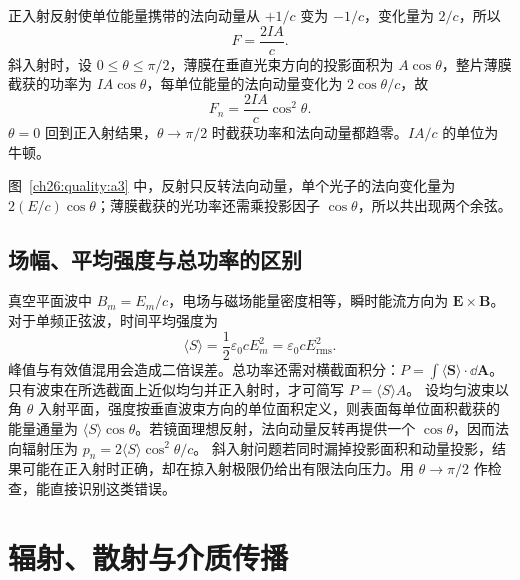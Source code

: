 {\begin{xesolution}
\begin{center}
\begin{minipage}{.96\linewidth}
\end{minipage}\end{center}

正入射反射使单位能量携带的法向动量从 $+1/c$ 变为 $-1/c$，变化量为 $2/c$，所以
\[
 \boxed{F=\frac{2IA}{c}}.
\]
斜入射时，设 $0\le\theta\le\pi/2$，薄膜在垂直光束方向的投影面积为 $A\cos\theta$，整片薄膜截获的功率为 $IA\cos\theta$，每单位能量的法向动量变化为
$2\cos\theta/c$，故
\[
 \boxed{F_n=\frac{2IA}{c}\cos^2\theta}.
\]
$\theta=0$ 回到正入射结果，$\theta\to\pi/2$ 时截获功率和法向动量都趋零。$IA/c$ 的单位为牛顿。

图~\ref{ch26:quality:a3} 中，反射只反转法向动量，单个光子的法向变化量为 $2(E/c)\cos\theta$；薄膜截获的光功率还需乘投影因子 $\cos\theta$，所以共出现两个余弦。
\end{xesolution}


\subsection{场幅、平均强度与总功率的区别}
真空平面波中 $B_m=E_m/c$，电场与磁场能量密度相等，瞬时能流方向为 $\boldsymbol E\times\boldsymbol B$。对于单频正弦波，时间平均强度为
\[
 \langle S\rangle=\frac12\varepsilon_0cE_m^2
 =\varepsilon_0cE_{\mathrm{rms}}^2.
\]
峰值与有效值混用会造成二倍误差。总功率还需对横截面积分：$P=\int\langle\boldsymbol S\rangle\cdot\dd\boldsymbol A$。只有波束在所选截面上近似均匀并正入射时，才可简写 $P=\langle S\rangle A$。
设均匀波束以角 $\theta$ 入射平面，强度按垂直波束方向的单位面积定义，则表面每单位面积截获的能量通量为 $\langle S\rangle\cos\theta$。若镜面理想反射，法向动量反转再提供一个 $\cos\theta$，因而法向辐射压为
$p_n=2\langle S\rangle\cos^2\theta/c$。
斜入射问题若同时漏掉投影面积和动量投影，结果可能在正入射时正确，却在掠入射极限仍给出有限法向压力。用 $\theta\to\pi/2$ 作检查，能直接识别这类错误。


\section{辐射、散射与介质传播}

}
